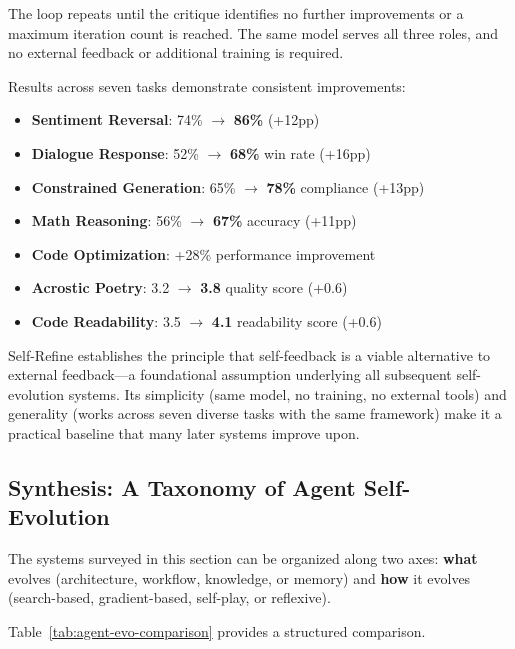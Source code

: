The loop repeats until the critique identifies no further improvements or a maximum iteration count is reached. The same model serves all three roles, and no external feedback or additional training is required.

Results across seven tasks demonstrate consistent improvements:

\begin{itemize}
\item \textbf{Sentiment Reversal}: 74\% $\rightarrow$ \textbf{86\%} (+12pp)
\item \textbf{Dialogue Response}: 52\% $\rightarrow$ \textbf{68\%} win rate (+16pp)
\item \textbf{Constrained Generation}: 65\% $\rightarrow$ \textbf{78\%} compliance (+13pp)
\item \textbf{Math Reasoning}: 56\% $\rightarrow$ \textbf{67\%} accuracy (+11pp)
\item \textbf{Code Optimization}: +28\% performance improvement
\item \textbf{Acrostic Poetry}: 3.2 $\rightarrow$ \textbf{3.8} quality score (+0.6)
\item \textbf{Code Readability}: 3.5 $\rightarrow$ \textbf{4.1} readability score (+0.6)
\end{itemize}

Self-Refine establishes the principle that self-feedback is a viable alternative to external feedback---a foundational assumption underlying all subsequent self-evolution systems. Its simplicity (same model, no training, no external tools) and generality (works across seven diverse tasks with the same framework) make it a practical baseline that many later systems improve upon.

\subsection{Synthesis: A Taxonomy of Agent Self-Evolution}
\label{sec:agent-taxonomy}

The systems surveyed in this section can be organized along two axes: \textbf{what} evolves (architecture, workflow, knowledge, or memory) and \textbf{how} it evolves (search-based, gradient-based, self-play, or reflexive).

Table~\ref{tab:agent-evo-comparison} provides a structured comparison.

